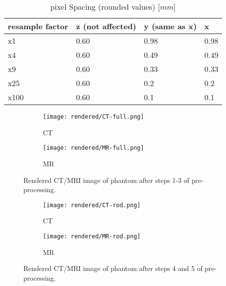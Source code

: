 \begin{table}[!htb]
\centering
\begin{tabular}{l|l|l|l}
resample factor  & z (not affected) &  y (same as x) & x \\
\toprule
x1     & 0.60 & 0.98	& 0.98	\\
x4     & 0.60 & 0.49	& 0.49	\\
x9     & 0.60 & 0.33	& 0.33	\\
x25    & 0.60 & 0.2 	& 0.2	\\
x100   & 0.60 & 0.1 	& 0.1
\end{tabular}
\caption{pixel Spacing (rounded values) [$mm$]}
\label{tab:spacing}
\end{table}

\begin{figure}[!thb]

  \begin{subfigure}[b]{0.45\textwidth}
    \texttt{[image: rendered/CT-full.png]}
    \caption{CT}
    \label{fig:CT_full}
  \end{subfigure}
  \hfill
  \begin{subfigure}[b]{0.45\textwidth}
    \texttt{[image: rendered/MR-full.png]}
    \caption{MR}
    \label{fig:MR_full}
  \end{subfigure}
  \caption{Rendered CT/MRI image of phantom after steps 1-3 of pre-processing.}
  \label{fig:rendering1-3}
\end{figure}
  
\begin{figure}[!thb]
  \begin{subfigure}[b]{0.45\textwidth}
    \texttt{[image: rendered/CT-rod.png]}
    \caption{CT}
    \label{fig:CT_rod}
  \end{subfigure}
  \hfill
  \begin{subfigure}[b]{0.45\textwidth}
    \texttt{[image: rendered/MR-rod.png]}
    \caption{MR}
    \label{fig:MR_rod}
  \end{subfigure}
  
  \caption{Rendered CT/MRI image of phantom after steps 4 and 5 of pre-processing.}
  \label{fig:rendering4-5}
\end{figure}

